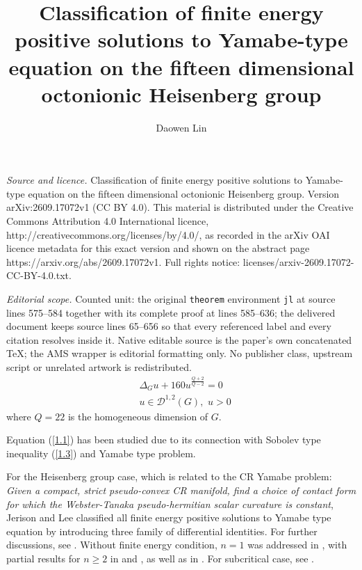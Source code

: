 \documentclass[10pt,a4paper]{amsart}
\numberwithin{equation}{section}
\begin{document}
\title[Classification of finite energy positive solutions to Yamabe]{Classification of finite energy positive solutions to Yamabe-type equation on the fifteen dimensional octonionic Heisenberg group}
\author{Daowen Lin}
\date{}
\maketitle
\noindent\emph{Source and licence.} Classification of finite energy positive solutions to Yamabe-type equation on the fifteen dimensional octonionic Heisenberg group. Version arXiv:2609.17072v1 (CC BY 4.0). This material is distributed under the Creative Commons Attribution 4.0 International licence, http://creativecommons.org/licenses/by/4.0/, as recorded in the arXiv OAI licence metadata for this exact version and shown on the abstract page https://arxiv.org/abs/2609.17072v1. Full rights notice: licenses/arxiv-2609.17072-CC-BY-4.0.txt.\par\smallskip
\noindent\textit{Editorial scope.} Counted unit: the original \texttt{theorem} environment \texttt{jl} at source lines 575--584 together with its complete proof at lines 585--636; the delivered document keeps source lines 65--656 so that every referenced label and every citation resolves inside it. Native editable source is the paper's own concatenated TeX; the AMS wrapper is editorial formatting only. No publisher class, upstream script or unrelated artwork is redistributed.
\begin{equation}\label{1.1}
    \begin{aligned}
        &\Delta_G u+160u^\frac{Q+2}{Q-2}=0\\& u\in \mathscr{D}^{1,2}(G),\,\,u> 0   
    \end{aligned}
\end{equation}
where $Q=22$ is the homogeneous dimension of $G$. 

Equation (\ref{1.1}) has been studied due to its  connection with  Sobolev type inequality (\ref{1.3}) and   Yamabe type problem.

For the Heisenberg group case, which is related to the CR Yamabe problem: \textit{Given a compact, strict pseudo-convex CR manifold, find a choice of contact form for which the Webster-Tanaka pseudo-hermitian scalar curvature is constant}, Jerison and Lee \cite{JL1988} classified all finite energy positive solutions to  Yamabe type equation by introducing three family of differential identities. For further discussions,  see \cite{G2001a} \cite{G2001b} \cite{JL1987} \cite{JL1989} \cite{W2015}. Without finite energy condition, $n=1$ was addressed in \cite{CLMR2023}, with partial results for $n\geq 2$ in \cite{CLMR2023} and \cite{FV2023}, as well as in \cite{CMRW2024}. For subcritical case, see \cite{MO2023} \cite{MOW2023}. 
\end{document}
